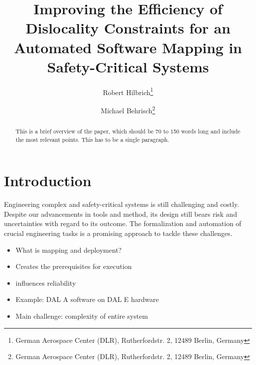 \documentclass[english,biblatex]{lni}
\begin{document}
\title[Improving the Efficiency of Dislocality Constraints]{Improving the Efficiency of Dislocality Constraints for an Automated Software Mapping in Safety-Critical Systems}
\author[Robert Hilbrich \and Michael Behrisch]
{Robert Hilbrich\footnote{German Aerospace Center (DLR), Rutherfordstr. 2, 12489 Berlin,
Germany } \and
Michael Behrisch\footnote{German Aerospace Center (DLR), Rutherfordstr. 2, 12489 Berlin,
Germany }}

\maketitle

\begin{abstract}
This is a brief overview of the paper, which should be 70 to 150 words long and
include the most relevant points. This has to be a single paragraph.
\end{abstract}
\section{Introduction}

Engineering complex and safety-critical systems is still challenging and costly.
Despite our advancements in tools and method, its design still bears risk and uncertainties with regard to its outcome.
The formalization and automation of crucial engineering tasks is a promising approach to tackle these challenges.

\begin{itemize}
\item What is mapping and deployment?
\item Creates the prerequisites for execution
\item influences reliability
\item Example: DAL A software on DAL E hardware
\item Main challenge: complexity of entire system
\end{itemize}
\end{document}
